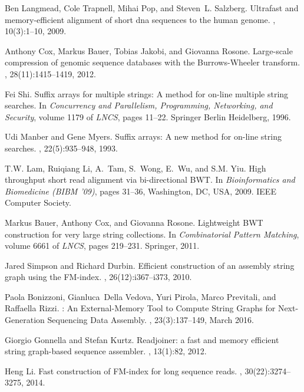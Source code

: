 \documentclass[11pt,oneside,a4paper]{article}
\begin{document}
\begin{thebibliography}{10}
Ben Langmead, Cole Trapnell, Mihai Pop, and Steven~L. Salzberg.
\newblock Ultrafast and memory-efficient alignment of short dna sequences to
  the human genome.
, 10(3):1--10, 2009.

Anthony Cox, Markus Bauer, Tobias Jakobi, and Giovanna Rosone.
\newblock Large-scale compression of genomic sequence databases with the
  {Burrows}-{Wheeler} transform.
, 28(11):1415--1419, 2012.

Fei Shi.
\newblock Suffix arrays for multiple strings: A method for on-line multiple
  string searches.
\newblock In {\em Concurrency and Parallelism, Programming, Networking, and
  Security}, volume 1179 of {\em LNCS}, pages 11--22. Springer Berlin
  Heidelberg, 1996.

Udi Manber and Gene Myers.
\newblock Suffix arrays: A new method for on-line string searches.
, 22(5):935--948, 1993.

T.W. Lam, Ruiqiang Li, A.~Tam, S.~Wong, E.~Wu, and S.M. Yiu.
\newblock High throughput short read alignment via bi-directional {BWT}.
\newblock In {\em Bioinformatics and Biomedicine (BIBM '09)}, pages 31--36,
  Washington, DC, USA, 2009. IEEE Computer Society.

Markus Bauer, Anthony Cox, and Giovanna Rosone.
\newblock Lightweight {BWT} construction for very large string collections.
\newblock In {\em Combinatorial Pattern Matching}, volume 6661 of {\em LNCS},
  pages 219--231. Springer, 2011.

Jared Simpson and Richard Durbin.
\newblock Efficient construction of an assembly string graph using the
  {FM}-index.
, 26(12):i367--i373, 2010.

Paola Bonizzoni, Gianluca~Della Vedova, Yuri Pirola, Marco Previtali, and
  Raffaella Rizzi.
: {An} {External}-{Memory} {Tool} to {Compute} {String} {Graphs}
  for {Next}-{Generation} {Sequencing} {Data} {Assembly}.
, 23(3):137--149, March 2016.

Giorgio Gonnella and Stefan Kurtz.
\newblock Readjoiner: a fast and memory efficient string graph-based sequence
  assembler.
, 13(1):82, 2012.

Heng Li.
\newblock Fast construction of {FM}-index for long sequence reads.
, 30(22):3274--3275, 2014.


\end{thebibliography}
\end{document}
